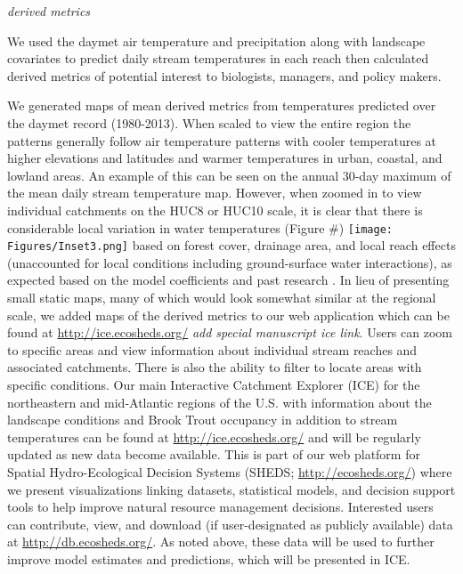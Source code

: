 \documentclass[]{article}
\begin{document}
\emph{derived metrics}

We used the daymet air temperature and precipitation along with
landscape covariates to predict daily stream temperatures in each reach
then calculated derived metrics of potential interest to biologists,
managers, and policy makers.

We generated maps of mean derived metrics from temperatures predicted
over the daymet record (1980-2013). When scaled to view the entire
region the patterns generally follow air temperature patterns with
cooler temperatures at higher elevations and latitudes and warmer
temperatures in urban, coastal, and lowland areas. An example of this
can be seen on the annual 30-day maximum of the mean daily stream
temperature map. However, when zoomed in to view individual catchments
on the HUC8 or HUC10 scale, it is clear that there is considerable local
variation in water temperatures (Figure \#)
\texttt{[image: Figures/Inset3.png]} based on forest cover, drainage
area, and local reach effects (unaccounted for local conditions
including ground-surface water interactions), as expected based on the
model coefficients and past research \citep{Kanno2013}. In lieu of
presenting small static maps, many of which would look somewhat similar
at the regional scale, we added maps of the derived metrics to our web
application which can be found at \url{http://ice.ecosheds.org/}
\emph{add special manuscript ice link}. Users can zoom to specific areas
and view information about individual stream reaches and associated
catchments. There is also the ability to filter to locate areas with
specific conditions. Our main Interactive Catchment Explorer (ICE) for
the northeastern and mid-Atlantic regions of the U.S. with information
about the landscape conditions and Brook Trout occupancy in addition to
stream temperatures can be found at \url{http://ice.ecosheds.org/} and
will be regularly updated as new data become available. This is part of
our web platform for Spatial Hydro-Ecological Decision Systems (SHEDS;
\url{http://ecosheds.org/}) where we present visualizations linking
datasets, statistical models, and decision support tools to help improve
natural resource management decisions. Interested users can contribute,
view, and download (if user-designated as publicly available) data at
\url{http://db.ecosheds.org/}. As noted above, these data will be used
to further improve model estimates and predictions, which will be
presented in ICE.
\end{document}
